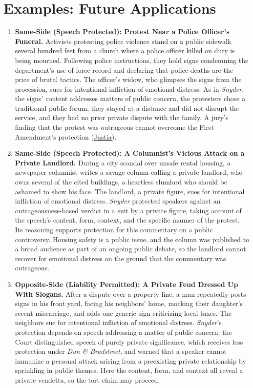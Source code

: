 \documentclass[12pt]{article}
\begin{document}
\section{Examples: Future Applications}
\begin{enumerate}

\item \textbf{Same-Side (Speech Protected): Protest Near a Police Officer's Funeral.} Activists protesting police violence stand on a public sidewalk several hundred feet from a church where a police officer killed on duty is being mourned. Following police instructions, they hold signs condemning the department's use-of-force record and declaring that police deaths are the price of brutal tactics. The officer's widow, who glimpses the signs from the procession, sues for intentional infliction of emotional distress. As in \textit{Snyder}, the signs' content addresses matters of public concern, the protesters chose a traditional public forum, they stayed at a distance and did not disrupt the service, and they had no prior private dispute with the family. A jury's finding that the protest was outrageous cannot overcome the First Amendment's protection (\href{https://supreme.justia.com/cases/federal/us/562/443/}{Justia}).

\item \textbf{Same-Side (Speech Protected): A Columnist's Vicious Attack on a Private Landlord.} During a city scandal over unsafe rental housing, a newspaper columnist writes a savage column calling a private landlord, who owns several of the cited buildings, a heartless slumlord who should be ashamed to show his face. The landlord, a private figure, sues for intentional infliction of emotional distress. \textit{Snyder} protected speakers against an outrageousness-based verdict in a suit by a private figure, taking account of the speech's content, form, context, and the specific manner of the protest. Its reasoning supports protection for this commentary on a public controversy. Housing safety is a public issue, and the column was published to a broad audience as part of an ongoing public debate, so the landlord cannot recover for emotional distress on the ground that the commentary was outrageous.

\item \textbf{Opposite-Side (Liability Permitted): A Private Feud Dressed Up With Slogans.} After a dispute over a property line, a man repeatedly posts signs in his front yard, facing his neighbors' home, mocking their daughter's recent miscarriage, and adds one generic sign criticizing local taxes. The neighbors sue for intentional infliction of emotional distress. \textit{Snyder}'s protection depends on speech addressing a matter of public concern; the Court distinguished speech of purely private significance, which receives less protection under \textit{Dun \& Bradstreet}, and warned that a speaker cannot immunize a personal attack arising from a preexisting private relationship by sprinkling in public themes. Here the content, form, and context all reveal a private vendetta, so the tort claim may proceed.


\end{enumerate}
\end{document}
